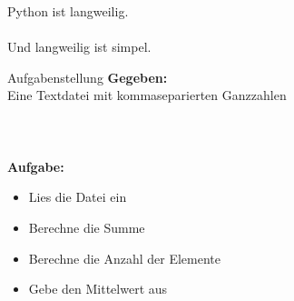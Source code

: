\documentclass{beamer}
\begin{document}
\begin{frame}
\begin{center}
{ \Huge Python ist langweilig.}\\~\\
\pause
{\Large Und langweilig ist simpel.}
\end{center}
\end{frame}

\begin{frame}[t]{Aufgabenstellung}
\textbf{Gegeben:}\\
\vspace{0.2cm}
Eine Textdatei mit kommaseparierten Ganzzahlen\\~\\~\\~\\
\textbf{Aufgabe:}
\begin{itemize}
\item Lies die Datei ein
\item Berechne die Summe
\item Berechne die Anzahl der Elemente
\item Gebe den Mittelwert aus
\end{itemize}
\end{frame}
\end{document}
